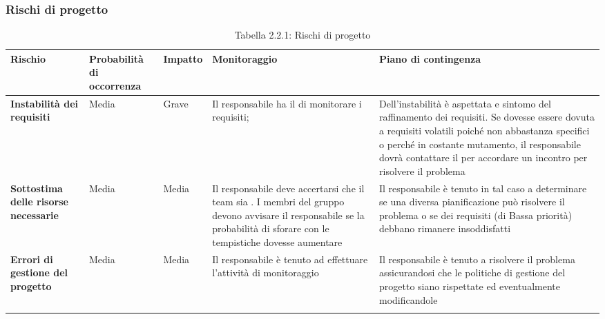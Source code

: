 	\subsubsection{Rischi di progetto}
\renewcommand{\arraystretch}{1.5}
\begin{longtable}{| m{8em} | m{6em} | m{4em} | m{9em} | m{9em} |}
\hline
\rowcolor{title_row}
\textbf{\color{title_text}Rischio} & \textbf{\color{title_text}Probabilità di occorrenza} & \textbf{\color{title_text}Impatto} & \textbf{\color{title_text}Monitoraggio} & \textbf{\color{title_text}Piano di contingenza} \\
\endhead
\hline \textbf{Instabilità dei requisiti} & Media & Grave &
	Il responsabile ha il \gl{compito} di monitorare i requisiti; &
	Dell'instabilità è aspettata e sintomo del raffinamento dei requisiti.	Se dovesse essere dovuta a requisiti volatili poiché non abbastanza specifici o perché in costante mutamento, il responsabile dovrà contattare il \gl{Proponente} per accordare un incontro per risolvere il problema \\
\hline \textbf{Sottostima delle risorse necessarie} & Media & Media &
	Il responsabile deve accertarsi che il team sia \gl{in-schedule}. I membri del gruppo devono avvisare il responsabile se la probabilità di sforare con le tempistiche dovesse aumentare &
	Il responsabile è tenuto in tal caso a determinare se una diversa pianificazione può risolvere il problema o se dei requisiti (di Bassa priorità) debbano rimanere insoddisfatti\\
\hline \textbf{Errori di gestione del progetto} & Media & Media &
	Il responsabile è tenuto ad effettuare l'attività di monitoraggio &
	Il responsabile è tenuto a risolvere il problema assicurandosi che le politiche di gestione del progetto siano rispettate ed eventualmente modificandole\\
\hline
\caption{Tabella 2.2.1: Rischi di progetto\label{}}
\end{longtable}
\pagebreak
\renewcommand{\arraystretch}{1}
